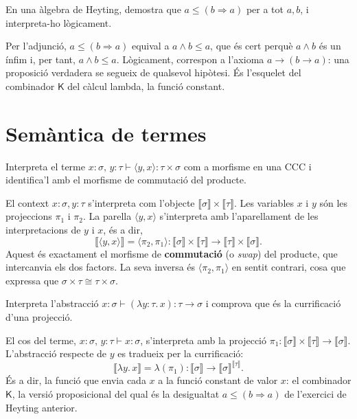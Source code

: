 \begin{exercici}
En una àlgebra de Heyting, demostra que $a\leq(b\Rightarrow a)$ per a tot $a,b$, i interpreta-ho lògicament.
\end{exercici}

\begin{solucio}
Per l'adjunció, $a\leq(b\Rightarrow a)$ equival a $a\wedge b\leq a$, que és cert perquè $a\wedge b$ és un ínfim i, per tant, $a\wedge b\leq a$. Lògicament, correspon a l'axioma $a\to(b\to a)$: una proposició verdadera se segueix de qualsevol hipòtesi. És l'esquelet del combinador $\mathsf{K}$ del càlcul lambda, la funció constant.
\end{solucio}

\section{Semàntica de termes}

\begin{exercici}
Interpreta el terme $x:\sigma,\,y:\tau\vdash\langle y,x\rangle:\tau\times\sigma$ com a morfisme en una CCC i identifica'l amb el morfisme de commutació del producte.
\end{exercici}

\begin{solucio}
El context $x:\sigma,y:\tau$ s'interpreta com l'objecte $\llbracket\sigma\rrbracket\times\llbracket\tau\rrbracket$. Les variables $x$ i $y$ són les projeccions $\pi_1$ i $\pi_2$. La parella $\langle y,x\rangle$ s'interpreta amb l'aparellament de les interpretacions de $y$ i $x$, és a dir,
\[
\llbracket\langle y,x\rangle\rrbracket=\langle\pi_2,\pi_1\rangle\colon\llbracket\sigma\rrbracket\times\llbracket\tau\rrbracket\to\llbracket\tau\rrbracket\times\llbracket\sigma\rrbracket.
\]
Aquest és exactament el morfisme de \textbf{commutació} (o \emph{swap}) del producte, que intercanvia els dos factors. La seva inversa és $\langle\pi_2,\pi_1\rangle$ en sentit contrari, cosa que expressa que $\sigma\times\tau\cong\tau\times\sigma$.
\end{solucio}

\begin{exercici}
Interpreta l'abstracció $x:\sigma\vdash(\lambda y{:}\tau.\,x):\tau\to\sigma$ i comprova que és la currificació d'una projecció.
\end{exercici}

\begin{solucio}
El cos del terme, $x:\sigma,\,y:\tau\vdash x:\sigma$, s'interpreta amb la projecció $\pi_1\colon\llbracket\sigma\rrbracket\times\llbracket\tau\rrbracket\to\llbracket\sigma\rrbracket$. L'abstracció respecte de $y$ es tradueix per la currificació:
\[
\llbracket\lambda y.\,x\rrbracket=\lambda(\pi_1)\colon\llbracket\sigma\rrbracket\to\llbracket\sigma\rrbracket^{\llbracket\tau\rrbracket}.
\]
És a dir, la funció que envia cada $x$ a la funció constant de valor $x$: el combinador $\mathsf{K}$, la versió proposicional del qual és la desigualtat $a\leq(b\Rightarrow a)$ de l'exercici de Heyting anterior.
\end{solucio}
